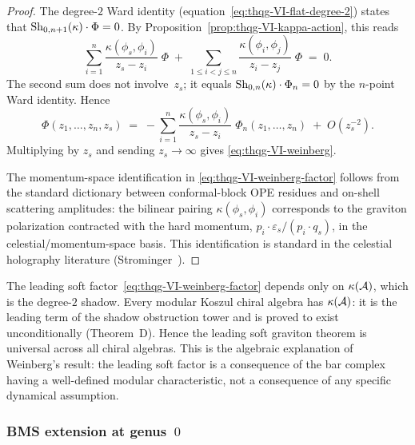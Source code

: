 \begin{proof}
The degree-$2$ Ward identity
(equation~\eqref{eq:thqg-VI-flat-degree-2}) states that
$\operatorname{Sh}_{0,n+1}(\kappa) \cdot \Phi = 0$.
By Proposition~\ref{prop:thqg-VI-kappa-action}, this reads
\[
\sum_{i=1}^{n}
\frac{\kappa(\phi_s, \phi_i)}{z_s - z_i}\;\Phi
\;+\;
\sum_{1 \leq i < j \leq n}
\frac{\kappa(\phi_i, \phi_j)}{z_i - z_j}\;\Phi
\;=\; 0.
\]
The second sum does not involve~$z_s$; it equals
$\operatorname{Sh}_{0,n}(\kappa) \cdot \Phi_n = 0$ by the $n$-point Ward
identity. Hence
\[
\Phi(z_1, \dotsc, z_n, z_s)
\;=\;
-\sum_{i=1}^{n}
\frac{\kappa(\phi_s, \phi_i)}{z_s - z_i}\;\Phi_n(z_1, \dotsc, z_n)
\;+\; O(z_s^{-2}).
\]
Multiplying by $z_s$ and sending $z_s \to \infty$ gives
\eqref{eq:thqg-VI-weinberg}.

The momentum-space identification in
\eqref{eq:thqg-VI-weinberg-factor} follows from the standard
dictionary between conformal-block OPE residues and on-shell
scattering amplitudes: the bilinear pairing $\kappa(\phi_s, \phi_i)$
corresponds to the graviton polarization contracted with the hard
momentum, $p_i \cdot \varepsilon_s / (p_i \cdot q_s)$, in the
celestial/momentum-space basis. This identification is standard
in the celestial holography literature
(Strominger~\cite{Strominger18}).
\end{proof}

\begin{remark}
\label{rem:thqg-VI-weinberg-universality}
The leading soft factor~\eqref{eq:thqg-VI-weinberg-factor} depends
only on $\kappa(\mathcal{A})$, which is the degree-$2$ shadow. Every
modular Koszul chiral algebra has $\kappa(\mathcal{A})$: it is the
leading term of the shadow obstruction tower and is proved to exist
unconditionally (Theorem~D). Hence the leading soft graviton
theorem is universal across all chiral algebras. This is the
algebraic explanation of Weinberg's result: the leading soft
factor is a consequence of the bar complex having a well-defined
modular characteristic, not a consequence of any specific
dynamical assumption.
\end{remark}

\subsubsection{BMS extension at genus~$0$}

